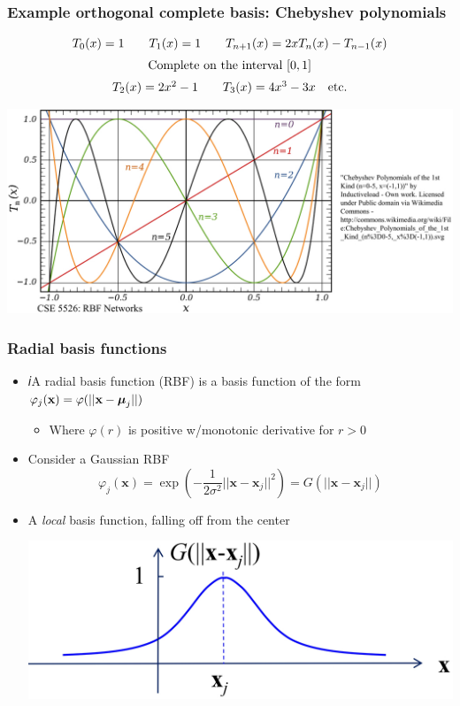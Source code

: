 \documentclass[12pt,notes,mathserif]{beamer}
\begin{document}
\begin{frame}[c]
	\frametitle{Example orthogonal complete basis: Chebyshev polynomials}
	\begin{equation*}
		\begin{array}{c}
			T_0(x)=1\qquad
			T_1(x)=1\qquad
			T_{n+1}(x)=2xT_n(x)-T_{n-1}(x)       \\[2mm]
			{\rm Complete~on~the~interval}~[0,1] \\[2mm]
			T_2(x)=2x^2-1\qquad
			T_3(x)=4x^3-3x\quad {\rm etc.}
		\end{array}
	\end{equation*}
	\begin{center}
		\includegraphics[width=0.85\linewidth]{fig/lec79.jpg}
	\end{center}
\end{frame}

\begin{frame}[c]
	\frametitle{Radial basis functions}
	\begin{itemize}
		\item 𝑖A radial basis function (RBF) is a basis function of the form $\varphi_j(\mathbf{x})=\varphi(||\mathbf{x}-\boldsymbol{\mu}_j||)$

		      \begin{itemize}
			      \item Where $\varphi(r)$ is positive w/monotonic derivative for $r> 0$
		      \end{itemize}
		\item Consider a Gaussian RBF
		      \[
			      \varphi_j(\mathbf{x})=\exp\left(-\dfrac{1}{2\sigma^2}||\mathbf{x}-\mathbf{x}_j||^2\right)=G(||\mathbf{x}-\mathbf{x}_j||)
		      \]
		\item A \textit{local} basis function, falling off from the center
		      \begin{center}
			      \includegraphics[width=0.85\linewidth]{fig/lec710.jpg}
		      \end{center}
	\end{itemize}
\end{frame}
\end{document}
